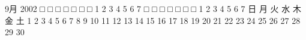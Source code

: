 \documentclass[11pt,titlepage]{jbook}
\begin{document}
\begin{progls}
      9月 2002
□ □ □ □ □ □ □
 1  2  3  4  5  6  7
 □ □ □ □ □ □ □
1  2  3  4  5  6  7
日 月 火 水 木 金 土
 1  2  3  4  5  6  7
 8  9 10 11 12 13 14
15 16 17 18 19 20 21
22 23 24 25 26 27 28
29 30

%
\end{progls}
\end{document}
